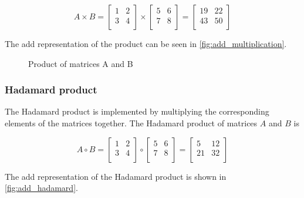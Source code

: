 \[
    A \times B = \begin{bmatrix}
                     1 & 2 \\
                     3 & 4 \\
    \end{bmatrix} \times \begin{bmatrix}
                             5 & 6 \\
                             7 & 8 \\
    \end{bmatrix} = \begin{bmatrix}
                        19 & 22 \\
                        43 & 50 \\
    \end{bmatrix}
\]

The \gls{add} representation of the product can be seen in \autoref{fig:add_multiplication}.
\begin{figure}
    \centering
    
    \caption{Product of matrices A and B}
    \label{fig:add_multiplication}
\end{figure}

\subsubsection{Hadamard product}
The Hadamard product is implemented by multiplying the corresponding elements of the matrices together.
The Hadamard product of matrices $A$ and $B$ is

\[
    A \circ B = \begin{bmatrix}
                    1 & 2 \\
                    3 & 4 \\
    \end{bmatrix} \circ \begin{bmatrix}
                            5 & 6 \\
                            7 & 8 \\
    \end{bmatrix} = \begin{bmatrix}
                        5  & 12 \\
                        21 & 32 \\
    \end{bmatrix}
\]

The \gls{add} representation of the Hadamard product is shown in \autoref{fig:add_hadamard}.

